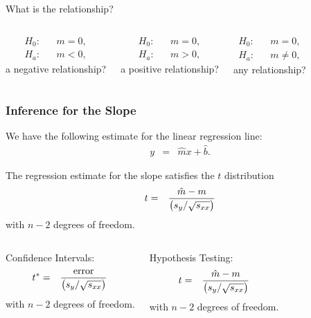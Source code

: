 \begin{frame}{What is the relationship?}


    \begin{columns}

      \begin{eqnarray*}
        H_0: & & m=0, \\
        H_a: & & m<0,
      \end{eqnarray*}
      a negative relationship?


      \begin{eqnarray*}
        H_0: & & m=0, \\
        H_a: & & m>0,
      \end{eqnarray*}
      a positive relationship?



      \begin{eqnarray*}
        H_0: & & m=0, \\
        H_a: & & m\neq 0,
      \end{eqnarray*}
      any relationship?

      
    \end{columns}

  
\end{frame}

\begin{frame}
  \frametitle{Inference for the Slope}

  We have the following estimate for the linear regression line:
  \begin{eqnarray*}
    y & = & \hat{m} x + \hat{b}.
  \end{eqnarray*}

  \begin{definition}
    The regression estimate for the slope satisfies the $t$ distribution
    \begin{eqnarray*}
      t & = & \frac{\hat{m}-m}{\left( s_y/\sqrt{s_{xx}} \right)}
    \end{eqnarray*}
    with $n-2$ degrees of freedom.
  \end{definition}

  \begin{columns}

    Confidence Intervals:
    \begin{eqnarray*}
      t^* & = & \frac{\mathrm{error}}{\left( s_y/\sqrt{s_{xx}} \right)}
    \end{eqnarray*}
    with $n-2$ degrees of freedom.


    Hypothesis Testing:
    \begin{eqnarray*}
      t & = & \frac{\hat{m}-m}{\left( s_y/\sqrt{s_{xx}}\right)}
    \end{eqnarray*}
    with $n-2$ degrees of freedom.

    
  \end{columns}

\end{frame}


